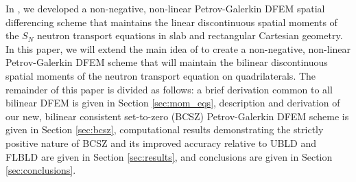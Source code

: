 \documentclass{mc2015}
\begin{document}
In \cite{csz_me}, we developed a non-negative, non-linear Petrov-Galerkin DFEM spatial differencing scheme that maintains the linear discontinuous spatial moments of the $S_N$ neutron transport equations in slab and rectangular Cartesian geometry.  
In this paper, we will extend the main idea of \cite{csz_me} to create a non-negative, non-linear Petrov-Galerkin DFEM scheme that will maintain the bilinear discontinuous spatial moments of the neutron transport equation on quadrilaterals.
The remainder of this paper is divided as follows: a brief derivation common to all bilinear DFEM is given in Section \ref{sec:mom_eqs}, description and derivation of our new, bilinear consistent set-to-zero (BCSZ) Petrov-Galerkin DFEM scheme is given in Section \ref{sec:bcsz},  computational results demonstrating the strictly positive nature of BCSZ and its improved accuracy relative to UBLD and FLBLD are given in Section \ref{sec:results}, and conclusions are given in Section \ref{sec:conclusions}.
\end{document}
